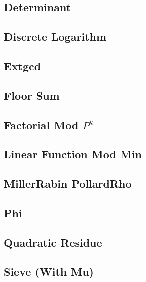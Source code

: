 \subsection{Determinant}

\subsection{Discrete Logarithm}

\subsection{Extgcd}

%
\subsection{Floor Sum}

\subsection{Factorial Mod $P^k$}

\subsection{Linear Function Mod Min}

%
\subsection{MillerRabin PollardRho}

\subsection{Phi}

\subsection{Quadratic Residue}

\subsection{Sieve (With Mu)}

